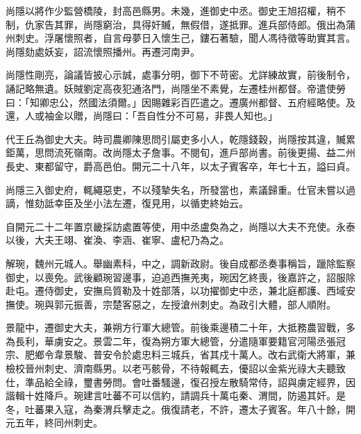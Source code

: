 \begin{pinyinscope}
 尚隱以將作少監營橋陵，封高邑縣男。未幾，進御史中丞。御史王旭招權，稍不制，仇家告其罪，尚隱窮治，具得奸贓，無假借，遂抵罪。進兵部侍郎。俄出為蒲州刺史。浮屠懷照者，自言母夢日入懷生己，鏤石著驗，聞人馮待徵等助實其言。尚隱劾處妖妄，詔流懷照播州。再遷河南尹。



 尚隱性剛亮，論議皆披心示誠，處事分明，御下不苛密。尤詳練故實，前後制令，誦記略無遺。妖賊劉定高夜犯通洛門，尚隱坐不素覺，左遷桂州都督。帝遣使勞曰：「知卿忠公，然國法須爾。」因賜雜彩百匹遣之。遷廣州都督、五府經略使。及還，人或袖金以贈，尚隱曰：「吾自性分不可易，非畏人知也。」



 代王丘為御史大夫。時司農卿陳思問引屬吏多小人，乾隱錢穀，尚隱按其違，贓累鉅萬，思問流死嶺南。改尚隱太子詹事。不閱旬，進戶部尚書。前後更揚、益二州長史、東都留守，爵高邑伯。開元二十八年，以太子賓客卒，年七十五，謚曰貞。



 尚隱三入御史府，輒繩惡吏，不以殘摯失名，所發當也，素議歸重。仕官未嘗以過謫，惟劾詆幸臣及坐小法左遷，復見用，以循吏終始云。



 自開元二十二年置京畿採訪處置等使，用中丞盧奐為之，尚隱以大夫不充使。永泰以後，大夫王翊、崔渙、李涵、崔寧、盧杞乃為之。



 解琬，魏州元城人。舉幽素科，中之，調新政尉。後自成都丞奏事稱旨，躐除監察御史，以喪免。武後顧琬習邊事，迫追西撫羌夷，琬因乞終喪，後嘉許之，詔服除赴屯。遷侍御史，安撫烏質勒及十姓部落，以功擢御史中丞，兼北庭都護、西域安撫使。琬與郭元振善，宗楚客惡之，左授滄州刺史。為政引大體，部人順附。



 景龍中，遷御史大夫，兼朔方行軍大總管。前後乘邊積二十年，大抵務農習戰，多為長利，華虜安之。景雲二年，復為朔方軍大總管，分遣隨軍要籍官河陽丞張冠宗、肥鄉令韋景駿、普安令於處忠料三城兵，省其戍十萬人。改右武衛大將軍，兼檢校晉州刺史、濟南縣男。以老丐骸骨，不待報輒去，優詔以金紫光祿大夫聽致仕，準品給全祿，璽書勞問。會吐番騷邊，復召授左散騎常侍，詔與虜定經界，因諧輯十姓降戶。琬建言吐蕃不可以信約，請調兵十萬屯秦、渭間，防遏其奸。是冬，吐蕃果入寇，為秦渭兵擊走之。俄復請老，不許，遷太子賓客。年八十餘，開元五年，終同州刺史。



\end{pinyinscope}